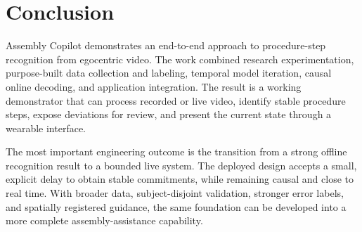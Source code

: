 \chapter{Conclusion}

Assembly Copilot demonstrates an end-to-end approach to procedure-step
recognition from egocentric video. The work combined research experimentation,
purpose-built data collection and labeling, temporal model iteration, causal
online decoding, and application integration. The result is a working
demonstrator that can process recorded or live video, identify stable procedure
steps, expose deviations for review, and present the current state through a
wearable interface.

The most important engineering outcome is the transition from a strong offline
recognition result to a bounded live system. The deployed design accepts a
small, explicit delay to obtain stable commitments, while remaining causal and
close to real time. With broader data, subject-disjoint validation, stronger
error labels, and spatially registered guidance, the same foundation can be
developed into a more complete assembly-assistance capability.
